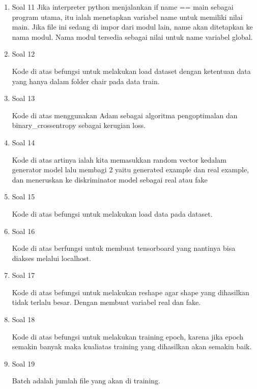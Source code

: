 \begin{enumerate}
    \item Soal 11
	\hfill\break
	Jika interpreter python menjalankan if name == main sebagai program utama, itu ialah menetapkan variabel name untuk memiliki nilai main. Jika file ini sedang di impor dari modul lain, name akan ditetapkan ke nama modul. Nama modul tersedia sebagai nilai untuk name variabel global.

    \item Soal 12
	\hfill\break
	
	Kode di atas befungsi untuk melakukan load dataset dengan ketentuan data yang hanya dalam folder chair pada data train.

    \item Soal 13
	\hfill\break
	
    Kode di atas menggunakan Adam sebagai algoritma pengoptimalan dan binary\_crossentropy sebagai kerugian loss. 
    
    \item Soal 14
	\hfill\break
	
	Kode di atas artinya ialah kita memasukkan random vector kedalam generator model lalu membagi 2 yaitu generated example dan real example, dan meneruskan ke diskriminator model sebagai real atau fake

    \item Soal 15
	\hfill\break
	
    Kode di atas befungsi untuk melakukan load data pada dataset.
    
    \item Soal 16
	\hfill\break
	
    Kode di atas berfungsi untuk membuat tensorboard yang nantinya bisa diakses melalui localhost.
    
    \item Soal 17
	\hfill\break
	
    Kode di atas befungsi untuk melakukan reshape agar shape yang dihasilkan tidak terlalu besar. Dengan membuat variabel real dan fake.
    
    \item Soal 18
	\hfill\break
	
	Kode di atas befungsi untuk melakukan training epoch, karena jika epoch semakin banyak maka kualiatas training yang dihasilkan akan semakin baik.

    \item Soal 19
	\hfill\break
	
    Batch adalah jumlah file yang akan di training.
    

\end{enumerate}
